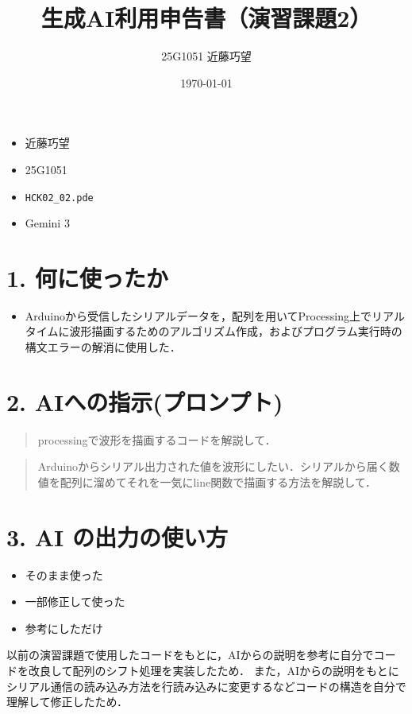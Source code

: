 \documentclass[uplatex,dvipdfmx]{jsarticle}
\title{生成AI利用申告書（演習課題2）}
\author{25G1051 近藤巧望}
\date{\today}
\begin{document}
\maketitle

\begin{itemize}[label=--]
    \item {} 近藤巧望
    \item {} 25G1051
    \item {} \texttt{HCK02\_02.pde}
    \item {} Gemini 3
\end{itemize}

\section*{1. 何に使ったか} 

\begin{itemize}
    \item Arduinoから受信したシリアルデータを，配列を用いてProcessing上でリアルタイムに波形描画するためのアルゴリズム作成，およびプログラム実行時の構文エラーの解消に使用した．
\end{itemize}

\section*{2. AIへの指示(プロンプト)} 
\begin{quote}
    processingで波形を描画するコードを解説して．
\end{quote}
\begin{quote}
    Arduinoからシリアル出力された値を波形にしたい．シリアルから届く数値を配列に溜めてそれを一気にline関数で描画する方法を解説して．
\end{quote}

\section*{3. AI の出力の使い方} 
\begin{itemize}
    \item [$\square$] そのまま使った 
    \item [\rlap{$\square$}\raisebox{.15ex}{\hspace{0.1em}$\checkmark$}] 一部修正して使った 
    \item [$\square$] 参考にしただけ 
\end{itemize}
以前の演習課題で使用したコードをもとに，AIからの説明を参考に自分でコードを改良して配列のシフト処理を実装したため．
また，AIからの説明をもとにシリアル通信の読み込み方法を行読み込みに変更するなどコードの構造を自分で理解して修正したため．
\end{document}
